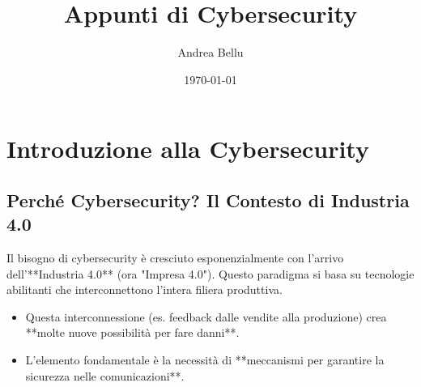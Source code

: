 \documentclass[a4paper,12pt]{article}
\title{Appunti di Cybersecurity}
\author{Andrea Bellu}
\date{\today}
\begin{document}
\maketitle

\section{Introduzione alla Cybersecurity}

\subsection{Perché Cybersecurity? Il Contesto di Industria 4.0}
Il bisogno di cybersecurity è cresciuto esponenzialmente con l'arrivo dell'**Industria 4.0** (ora "Impresa 4.0"). Questo paradigma si basa su tecnologie abilitanti che interconnettono l'intera filiera produttiva.
\begin{itemize}
    \item Questa interconnessione (es. feedback dalle vendite alla produzione) crea **molte nuove possibilità per fare danni**.
    \item L'elemento fondamentale è la necessità di **meccanismi per garantire la sicurezza nelle comunicazioni**.
\end{itemize}
\end{document}
